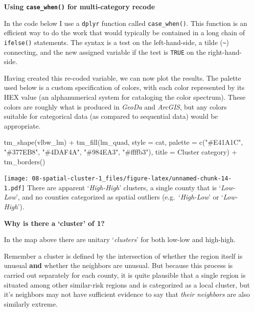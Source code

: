 \documentclass[
]{book}
\newenvironment{Shaded}{\begin{snugshade}}{\end{snugshade}}
\newcommand{\AttributeTok}[1]{\textcolor[rgb]{0.77,0.63,0.00}{#1}}
\newcommand{\FunctionTok}[1]{\textcolor[rgb]{0.00,0.00,0.00}{#1}}
\newcommand{\NormalTok}[1]{#1}
\newcommand{\SpecialCharTok}[1]{\textcolor[rgb]{0.00,0.00,0.00}{#1}}
\newcommand{\StringTok}[1]{\textcolor[rgb]{0.31,0.60,0.02}{#1}}
\newenvironment{rmdnote}[1]
  {
  \begin{itemize}
  \renewcommand{\labelitemi}{
    \raisebox{-.7\height}[0pt][0pt]{
      {\setkeys{Gin}{width=3em,keepaspectratio}\texttt{[image: images/\#1]}}
    }
  }
  \setlength{\fboxsep}{1em}
  \begin{note}
  \item
  }
  {
  \end{note}
  \end{itemize}
  }
\newenvironment{rmdtip}[1]
  {
  \begin{itemize}
  \renewcommand{\labelitemi}{
    \raisebox{-.7\height}[0pt][0pt]{
      {\setkeys{Gin}{width=3em,keepaspectratio}\texttt{[image: images/\#1]}}
    }
  }
  \setlength{\fboxsep}{1em}
  \begin{tip}
  \item
  }
  {
  \end{tip}
  \end{itemize}
  }
\begin{document}
\begin{rmdtip}{tip}
\textbf{Using \texttt{case\_when()} for multi-category recode}

In the code below I use a \texttt{dplyr} function called \texttt{case\_when()}. This function is an efficient way to do the work that would typically be contained in a long chain of \texttt{ifelse()} statements. The syntax is a test on the left-hand-side, a tilde (\texttt{\textasciitilde{}}) connecting, and the new assigned variable if the test is \texttt{TRUE} on the right-hand-side.

\end{rmdtip}

Having created this re-coded variable, we can now plot the results. The palette used below is a custom specification of colors, with each color represented by its HEX value (an alphanumerical system for cataloging the color spectrum). These colors are roughly what is produced in \emph{GeoDa} and \emph{ArcGIS}, but any colors suitable for categorical data (as compared to sequential data) would be appropriate.

\begin{Shaded}
\begin{Highlighting}[]
\FunctionTok{tm\_shape}\NormalTok{(vlbw\_lm) }\SpecialCharTok{+}
  \FunctionTok{tm\_fill}\NormalTok{(}\StringTok{\textquotesingle{}lm\_quad\textquotesingle{}}\NormalTok{,}
          \AttributeTok{style =} \StringTok{\textquotesingle{}cat\textquotesingle{}}\NormalTok{,}
          \AttributeTok{palette =} \FunctionTok{c}\NormalTok{(}\StringTok{"\#E41A1C"}\NormalTok{, }\StringTok{"\#377EB8"}\NormalTok{, }\StringTok{"\#4DAF4A"}\NormalTok{, }\StringTok{"\#984EA3"}\NormalTok{, }\StringTok{"\#ffffb3"}\NormalTok{),}
          \AttributeTok{title =} \StringTok{\textquotesingle{}Cluster category\textquotesingle{}}\NormalTok{) }\SpecialCharTok{+}
  \FunctionTok{tm\_borders}\NormalTok{()}
\end{Highlighting}
\end{Shaded}

\texttt{[image: 08-spatial-cluster-1\_files/figure-latex/unnamed-chunk-14-1.pdf]}
There are apparent `\emph{High-High}' clusters, a single county that is `\emph{Low-Low}', and no counties categorized as spatial outliers (e.g.~`\emph{High-Low}' or `\emph{Low-High}').

\begin{rmdnote}{note}
\textbf{Why is there a `cluster' of 1?}

In the map above there are unitary `\emph{clusters}' for both low-low and high-high.

Remember a cluster is defined by the intersection of whether the region itself is unusual \textbf{and} whether the neighbors are unusual. But because this process is carried out separately for each county, it is quite plausible that a single region is situated among other similar-risk regions and is categorized as a local cluster, but it's neighbors may not have sufficient evidence to say that \emph{their neighbors} are also similarly extreme.

\end{rmdnote}
\end{document}
